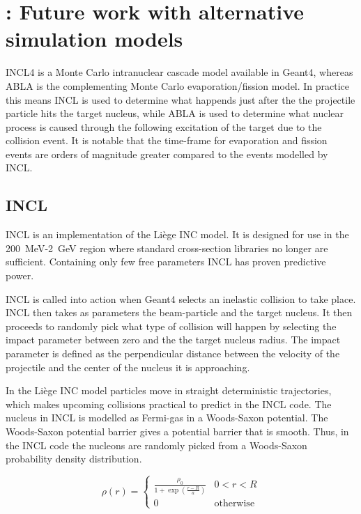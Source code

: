 \section{\label{appendixincltheory}: Future work with alternative simulation models}

INCL4 is a Monte Carlo intranuclear cascade model available in Geant4, whereas ABLA is the complementing Monte Carlo evaporation/fission model. In practice this means INCL is used to determine what happends just after the the projectile particle hits the target nucleus, while ABLA is used to determine what nuclear process is caused through the following excitation of the target due to the collision event. It is notable that the time-frame for evaporation and fission events are orders of magnitude greater compared to the events modelled by INCL.

\subsection{INCL}

INCL is an implementation of the Liège INC model. It is designed for use in the 200~MeV-2~GeV region where standard cross-section libraries no longer are sufficient. Containing only few free parameters INCL has proven predictive power.

INCL is called into action when Geant4 selects an inelastic collision to take place. INCL then takes as parameters the beam-particle and the target nucleus. It then proceeds to randomly pick what type of collision will happen by selecting the impact parameter between zero and the the target nucleus radius. The impact parameter is defined as the perpendicular distance between the velocity of the projectile and the center of the nucleus it is approaching.

In the Liège INC model particles move in straight deterministic trajectories, which makes upcoming collisions practical to predict in the INCL code.
 The nucleus in INCL is modelled as Fermi-gas in a Woods-Saxon potential. %
 The Woods-Saxon potential barrier gives a potential barrier that is smooth. Thus, in the INCL code the nucleons are randomly picked from a Woods-Saxon probability density distribution.

\begin{equation}
\rho(r) = \begin{cases}
\frac{\rho_{0}}{1+\exp({\frac{r-R}{a}})} & 0 < r < R \\
0 & \text{otherwise}
\end{cases}
\label{WoodsSaxonINCL}
\end{equation}


